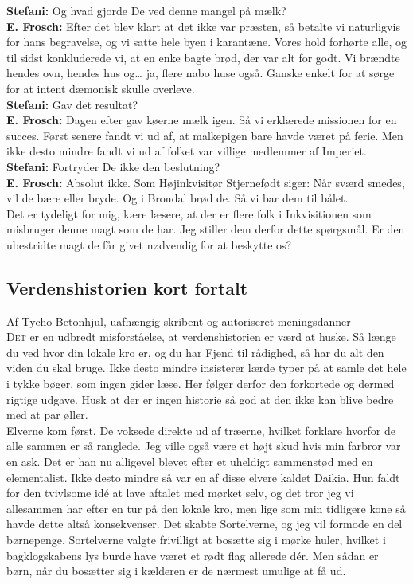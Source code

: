 \documentclass[letterpaper,12pt]{memoir}
\newcommand{\byline}[1]{\textsf{\small\color{Gray} Af #1}}
\begin{document}
\textbf{Stefani:} Og hvad gjorde De ved denne mangel på mælk?\\
\textbf{E. Frosch:} Efter det blev klart at det ikke var præsten, så betalte vi naturligvis for hans begravelse, og vi satte hele byen i karantæne. Vores hold forhørte alle, og til sidst konkluderede vi, at en enke bagte brød, der var alt for godt. Vi brændte hendes ovn, hendes hus og… ja, flere nabo huse også. Ganske enkelt for at sørge for at intent dæmonisk skulle overleve.\\

\textbf{Stefani:} Gav det resultat?\\
\textbf{E. Frosch:} Dagen efter gav køerne mælk igen. Så vi erklærede missionen for en succes. Først senere fandt vi ud af, at malkepigen bare havde været på ferie. Men ikke desto mindre fandt vi ud af folket var villige medlemmer af Imperiet.\\

\textbf{Stefani:} Fortryder De ikke den beslutning?\\
\textbf{E. Frosch:} Absolut ikke. Som Højinkvisitør Stjernefødt siger: Når sværd smedes, vil de bære eller bryde. Og i Brondal brød de. Så vi bar dem til bålet.\\

Det er tydeligt for mig, kære læsere, at der er flere folk i Inkvisitionen som misbruger denne magt som de har. Jeg stiller dem derfor dette spørgsmål. Er den ubestridte magt de får givet nødvendig for at beskytte os?

\subsection*{Verdenshistorien kort fortalt}
\byline{Tycho Betonhjul, uafhængig skribent og autoriseret meningsdanner}\\
\lettrine[lines=3,lhang=0.1,loversize=0.05]{D}{et} er en udbredt misforståelse, at verdenshistorien er værd at huske. Så længe du ved hvor din lokale kro er, og du har Fjend til rådighed, så har du alt den viden du skal bruge. Ikke desto mindre insisterer lærde typer på at samle det hele i tykke bøger, som ingen gider læse. Her følger derfor den forkortede og dermed rigtige udgave. Husk at der er ingen historie så god at den ikke kan blive bedre med at par øller. \\

Elverne kom først. De voksede direkte ud af træerne, hvilket forklare hvorfor de alle sammen er så ranglede. Jeg ville også være et højt skud hvis min farbror var en ask. Det er han nu alligevel blevet efter et uheldigt sammenstød med en elementalist. Ikke desto mindre så var en af disse elvere kaldet Daikia. Hun faldt for den tvivlsome idé at lave aftalet med mørket selv, og det tror jeg vi allesammen har efter en tur på den lokale kro, men lige som min tidligere kone så havde dette altså konsekvenser. Det skabte Sortelverne, og jeg vil formode en del børnepenge. Sortelverne valgte frivilligt at bosætte sig i mørke huler, hvilket i bagklogskabens lys burde have været et rødt flag allerede dér. Men sådan er børn, når du bosætter sig i kælderen er de nærmest umulige at få ud.\\
\end{document}
